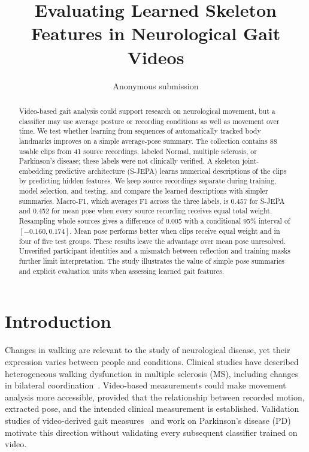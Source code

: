 \documentclass[10pt,twocolumn,letterpaper]{article}
\title{Evaluating Learned Skeleton Features in Neurological Gait Videos}
\author{Anonymous submission}
\begin{document}
\maketitle
\begin{abstract}
Video-based gait analysis could support research on neurological movement, but a classifier may use average posture or recording conditions as well as movement over time. We test whether learning from sequences of automatically tracked body landmarks improves on a simple average-pose summary. The collection contains 88 usable clips from 41 source recordings, labeled Normal, multiple sclerosis, or Parkinson's disease; these labels were not clinically verified. A skeleton joint-embedding predictive architecture (S-JEPA) learns numerical descriptions of the clips by predicting hidden features. We keep source recordings separate during training, model selection, and testing, and compare the learned descriptions with simpler summaries. Macro-F1, which averages F1 across the three labels, is 0.457 for S-JEPA and 0.452 for mean pose when every source recording receives equal total weight. Resampling whole sources gives a difference of 0.005 with a conditional 95\% interval of $[-0.160,0.174]$. Mean pose performs better when clips receive equal weight and in four of five test groups. These results leave the advantage over mean pose unresolved. Unverified participant identities and a mismatch between reflection and training masks further limit interpretation. The study illustrates the value of simple pose summaries and explicit evaluation units when assessing learned gait features.
\end{abstract}

\section{Introduction}
Changes in walking are relevant to the study of neurological disease, yet their expression varies between people and conditions. Clinical studies have described heterogeneous walking dysfunction in multiple sclerosis (MS), including changes in bilateral coordination~\cite{filli2018,plotnik2020}. Video-based measurements could make movement analysis more accessible, provided that the relationship between recorded motion, extracted pose, and the intended clinical measurement is established. Validation studies of video-derived gait measures~\cite{stenum2021,stenum2024} and work on Parkinson's disease (PD)~\cite{shin2021} motivate this direction without validating every subsequent classifier trained on video.
\end{document}
